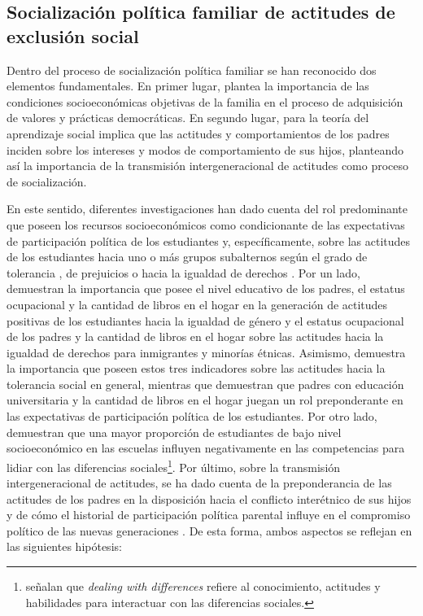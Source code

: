 \documentclass[12pt,twoside]{templates/facsothesis}
\begin{document}
\hypertarget{socializaciuxf3n-poluxedtica-familiar-de-actitudes-de-exclusiuxf3n-social}{%
\subsection{Socialización política familiar de actitudes de exclusión social}\label{socializaciuxf3n-poluxedtica-familiar-de-actitudes-de-exclusiuxf3n-social}}

Dentro del proceso de socialización política familiar se han reconocido dos elementos fundamentales. En primer lugar, \citet{lipset_hombre_1997} plantea la importancia de las condiciones socioeconómicas objetivas de la familia en el proceso de adquisición de valores y prácticas democráticas. En segundo lugar, para \citet{bandura_sociallearning_1969} la teoría del aprendizaje social implica que las actitudes y comportamientos de los padres inciden sobre los intereses y modos de comportamiento de sus hijos, planteando así la importancia de la transmisión intergeneracional de actitudes como proceso de socialización.

En este sentido, diferentes investigaciones han dado cuenta del rol predominante que poseen los recursos socioeconómicos como condicionante de las expectativas de participación política de los estudiantes \citep{castillo_Social_2014} y, específicamente, sobre las actitudes de los estudiantes hacia uno o más grupos subalternos según el grado de tolerancia \citep{farkac_Tolerance_2020}, de prejuicios \citep{weber_educational_2020} o hacia la igualdad de derechos \citep{isac_Native_2012, miranda_Political_2018}. Por un lado, \citet{miranda_Political_2018} demuestran la importancia que posee el nivel educativo de los padres, el estatus ocupacional y la cantidad de libros en el hogar en la generación de actitudes positivas de los estudiantes hacia la igualdad de género y el estatus ocupacional de los padres y la cantidad de libros en el hogar sobre las actitudes hacia la igualdad de derechos para inmigrantes y minorías étnicas. Asimismo, \citet{ortiz_Actitudes_2016} demuestra la importancia que poseen estos tres indicadores sobre las actitudes hacia la tolerancia social en general, mientras que \citet{castillo_Social_2014} demuestran que padres con educación universitaria y la cantidad de libros en el hogar juegan un rol preponderante en las expectativas de participación política de los estudiantes. Por otro lado, \citet{sincer_relationship_2020} demuestran que una mayor proporción de estudiantes de bajo nivel socioeconómico en las escuelas influyen negativamente en las competencias para lidiar con las diferencias sociales\footnote{\citet{sincer_relationship_2020} señalan que \emph{dealing with differences} refiere al conocimiento, actitudes y habilidades para interactuar con las diferencias sociales.}. Por último, sobre la transmisión intergeneracional de actitudes, se ha dado cuenta de la preponderancia de las actitudes de los padres en la disposición hacia el conflicto interétnico de sus hijos \citep{medjedovic_intergroup_2021} y de cómo el historial de participación política parental influye en el compromiso político de las nuevas generaciones \citep{bacovsky_raising_2021}. De esta forma, ambos aspectos se reflejan en las siguientes hipótesis:
\end{document}
